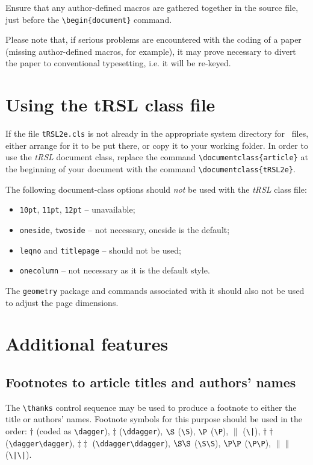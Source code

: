 \documentclass[]{tRSL2e}
\begin{document}
Ensure that any author-defined macros are gathered together in the source file, just before the
\verb"\begin{document}" command.

Please note that, if serious problems are encountered with the coding of a paper (missing author-defined macros,
for example), it may prove necessary to divert the paper to conventional typesetting, i.e. it will be re-keyed.


\section{Using the {\bi tRSL} class file}

If the file {\tt tRSL2e.cls} is not already in the appropriate system directory for \LaTeXe\ files, either
arrange for it to be put there, or copy it to your working folder. In order to use the {\it tRSL} document class, replace
the command \verb"\documentclass{article}" at the beginning of your document with the command \verb"\documentclass{tRSL2e}".

The following document-class options should {\em not\/} be used with the {\it tRSL} class file:
%
\begin{itemize}
   \item {\tt 10pt}, {\tt 11pt}, {\tt 12pt} -- unavailable;
   \item {\tt oneside}, {\tt twoside} -- not necessary, oneside is the default;
   \item {\tt leqno} and {\tt titlepage} -- should not be used;
   \item {\tt onecolumn} -- not necessary as it is the default style.
\end{itemize}
%
The {\tt geometry} package and commands associated with it should also not be used to adjust the page dimensions.


\section{Additional features}

\subsection{Footnotes to article titles and authors' names}

The \verb"\thanks" control sequence may be used to produce a footnote to either the title or authors' names.
Footnote symbols for this purpose should be used in the order: $\dagger$ (coded as \verb"\dagger"), $\ddagger$ (\verb"\ddagger"), $\S$ (\verb"\S"), $\P$ (\verb"\P"), $\|$ (\verb"\|"),\break
$\dagger\dagger$ (\verb"\dagger\dagger"), $\ddagger\ddagger$ (\verb"\ddagger\ddagger"), $\S\S$ (\verb"\S\S"), $\P\P$ (\verb"\P\P"), $\|\|$ (\verb"\|\|").
\end{document}

